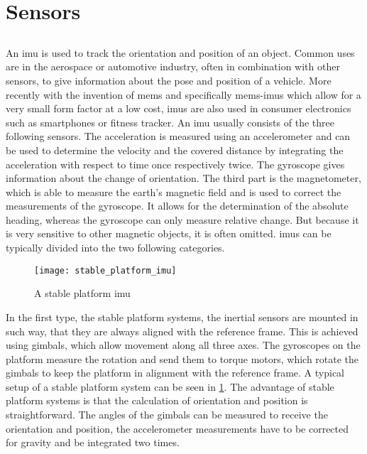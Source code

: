 \section{Sensors}
\subsection{}
An \gls{imu} is used to track the orientation and position of an object.
Common uses are in the aerospace or automotive industry, often in combination with other sensors, to give information about the pose and position of a vehicle.
More recently with the invention of \gls{mems} and specifically \gls{mems}-\gls{imu}s which allow for a very small form factor at a low cost, \gls{imu}s are also used in consumer electronics such as smartphones or fitness tracker.
An \gls{imu} usually consists of the three following sensors.
The acceleration is measured using an accelerometer and can be used to determine the velocity and the covered distance by integrating the acceleration with respect to time once respectively twice.
The gyroscope gives information about the change of orientation.
The third part is the magnetometer, which is able to measure the earth's magnetic field and is used to correct the measurements of the gyroscope.
It allows for the determination of the absolute heading, whereas the gyroscope can only measure relative change. But because it is very sensitive to other magnetic objects, it is often omitted.
\gls{imu}s can be typically divided into the two following categories.\\
\begin{figure}[htbp]
	\centering
	\texttt{[image: stable\_platform\_imu]}
	\caption{A stable platform \acrshort{imu} \cite{Woodman2007}}
	\label{fig:stable_platform_imu}
\end{figure}
In the first type, the stable platform systems, the inertial sensors are mounted in such way, that they are always aligned with the reference frame.
This is achieved using gimbals, which allow movement along all three axes.
The gyroscopes on the platform measure the rotation and send them to torque motors, which rotate the gimbals to keep the platform in alignment with the reference frame.
A typical setup of a stable platform system can be seen in \cref{fig:stable_platform_imu}.
The advantage of stable platform systems is that the calculation of orientation and position is straightforward.
The angles of the gimbals can be measured to receive the orientation and position, the accelerometer measurements have to be corrected for gravity and be integrated two times.
